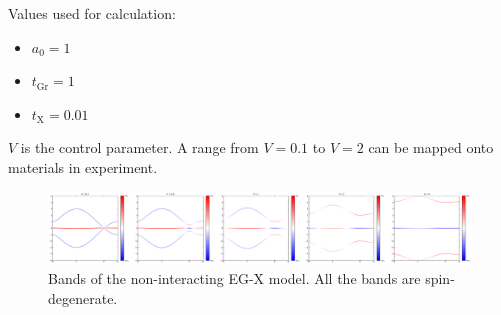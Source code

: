 \documentclass[../main.tex]{subfiles}
\begin{document}
	Values used for calculation:
	\begin{itemize}
		\item \(a_0 = 1\)
		\item \(t_{\mathrm{Gr}} = 1\)
		\item \(t_{\mathrm{X}} = 0.01\)
	\end{itemize}
	\(V\) is the control parameter.
	A range from \(V=0.1\) to \(V=2\) can be mapped onto materials in experiment.
	
	\begin{figure}[t]
		\centering
		\includegraphics[width=\textwidth]{images/EG_X bands_tGr_1_tX_0.01}
		\caption{Bands of the non-interacting EG-X model. All the bands are spin-degenerate.}
		\label{fig:EG-X model non-interacting bands}
	\end{figure}
\end{document}
